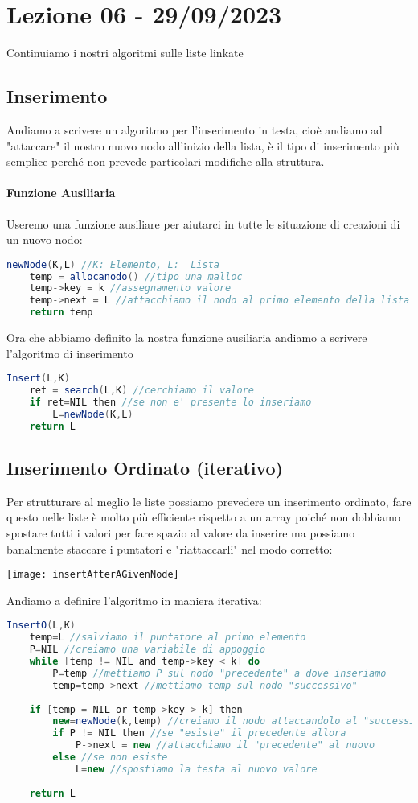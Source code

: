 \section{Lezione 06 - 29/09/2023}
Continuiamo i nostri algoritmi sulle liste linkate
\subsection{Inserimento}
Andiamo a scrivere un algoritmo per l'inserimento in testa, cioè andiamo ad "attaccare" il nostro nuovo nodo all'inizio della lista, è il tipo di inserimento più semplice perché non prevede particolari modifiche alla struttura.
\paragraph{Funzione Ausiliaria} Useremo una funzione ausiliare per aiutarci in tutte le situazione di creazioni di un nuovo nodo:
\begin{lstlisting}[language=Java]
newNode(K,L) //K: Elemento, L:  Lista
	temp = allocanodo() //tipo una malloc
	temp->key = k //assegnamento valore
	temp->next = L //attacchiamo il nodo al primo elemento della lista in input
	return temp
\end{lstlisting}
Ora che abbiamo definito la nostra funzione ausiliaria andiamo a scrivere l'algoritmo di inserimento
\begin{lstlisting}[language=Java]
Insert(L,K)
	ret = search(L,K) //cerchiamo il valore
	if ret=NIL then //se non e' presente lo inseriamo
		L=newNode(K,L)
	return L
\end{lstlisting}

\subsection{Inserimento Ordinato (iterativo)}
Per strutturare al meglio le liste possiamo prevedere un inserimento ordinato, fare questo nelle liste è molto più efficiente rispetto a un array poiché non dobbiamo spostare tutti i valori per fare spazio al valore da inserire ma possiamo banalmente staccare i puntatori e "riattaccarli" nel modo corretto:
\begin{center}
\texttt{[image: insertAfterAGivenNode]}
\end{center}
\newpage
Andiamo a definire l'algoritmo in maniera iterativa:
\begin{lstlisting}[language=Java]
InsertO(L,K)
	temp=L //salviamo il puntatore al primo elemento
	P=NIL //creiamo una variabile di appoggio
	while [temp != NIL and temp->key < k] do 
		P=temp //mettiamo P sul nodo "precedente" a dove inseriamo
		temp=temp->next //mettiamo temp sul nodo "successivo"
		
	if [temp = NIL or temp->key > k] then
		new=newNode(k,temp) //creiamo il nodo attaccandolo al "successivo"
		if P != NIL then //se "esiste" il precedente allora
			P->next = new //attacchiamo il "precedente" al nuovo
		else //se non esiste
			L=new //spostiamo la testa al nuovo valore 
			
	return L 	
\end{lstlisting}


